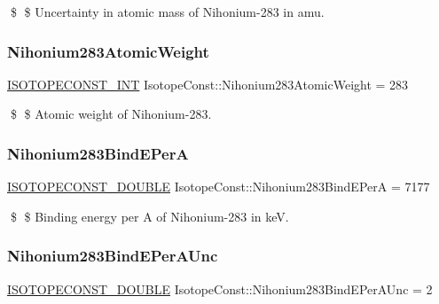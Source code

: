 \$ \$ Uncertainty in atomic mass of Nihonium-\/283 in amu. \mbox{\label{group___isotope_const-_nihonium-_nh283_gaf457f97ce9e7894248d4d7cb2968a164}} 
\subsubsection{\texorpdfstring{Nihonium283\+Atomic\+Weight}{Nihonium283AtomicWeight}}
{\footnotesize\ttfamily \mbox{\hyperlink{group___isotope_const-_macros_ga5f18360b3e99483a35c32d789e62621c}{I\+S\+O\+T\+O\+P\+E\+C\+O\+N\+S\+T\+\_\+\+I\+NT}} Isotope\+Const\+::\+Nihonium283\+Atomic\+Weight = 283}

\$ \$ Atomic weight of Nihonium-\/283. \mbox{\label{group___isotope_const-_nihonium-_nh283_gad82c700a34e58f5ef88e10ed1a7d1dbb}} 
\subsubsection{\texorpdfstring{Nihonium283\+Bind\+E\+PerA}{Nihonium283BindEPerA}}
{\footnotesize\ttfamily \mbox{\hyperlink{group___isotope_const-_macros_ga8f45a7272ce02c0b4c65c44636ed719a}{I\+S\+O\+T\+O\+P\+E\+C\+O\+N\+S\+T\+\_\+\+D\+O\+U\+B\+LE}} Isotope\+Const\+::\+Nihonium283\+Bind\+E\+PerA = 7177}

\$ \$ Binding energy per A of Nihonium-\/283 in keV. \mbox{\label{group___isotope_const-_nihonium-_nh283_gac424d79895de02ecece956b3d6601d09}} 
\subsubsection{\texorpdfstring{Nihonium283\+Bind\+E\+Per\+A\+Unc}{Nihonium283BindEPerAUnc}}
{\footnotesize\ttfamily \mbox{\hyperlink{group___isotope_const-_macros_ga8f45a7272ce02c0b4c65c44636ed719a}{I\+S\+O\+T\+O\+P\+E\+C\+O\+N\+S\+T\+\_\+\+D\+O\+U\+B\+LE}} Isotope\+Const\+::\+Nihonium283\+Bind\+E\+Per\+A\+Unc = 2}

